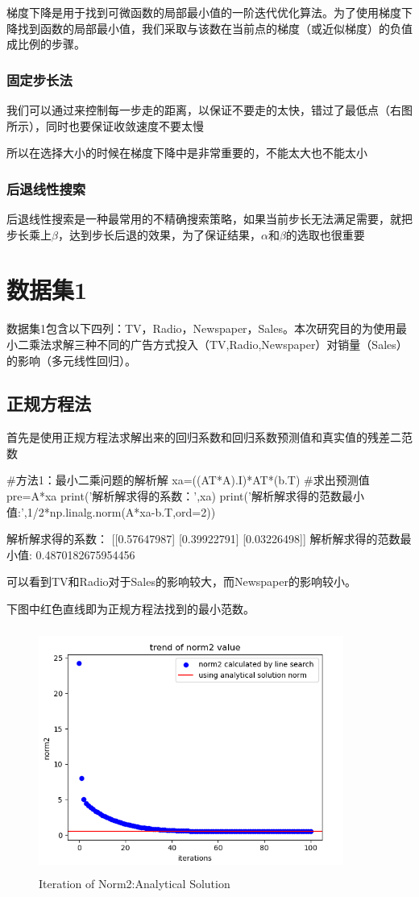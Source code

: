 \documentclass[12pt, a4paper, oneside, fontset=windows]{ctexart}
\begin{document}
梯度下降是用于找到可微函数的局部最小值的一阶迭代优化算法。为了使用梯度下降找到函数的局部最小值，我们采取与该数在当前点的梯度（或近似梯度）的负值成比例的步骤。
\subsubsection{固定步长法}
我们可以通过来控制每一步走的距离，以保证不要走的太快，错过了最低点（右图所示），同时也要保证收敛速度不要太慢

所以在选择大小的时候在梯度下降中是非常重要的，不能太大也不能太小

\subsubsection{后退线性搜索}
后退线性搜索是一种最常用的不精确搜索策略，如果当前步长无法满足需要，就把步长乘上$\beta$，达到步长后退的效果，为了保证结果，$\alpha$和$\beta$的选取也很重要
\section{数据集1}
数据集1包含以下四列：TV，Radio，Newspaper，Sales。本次研究目的为使用最小二乘法求解三种不同的广告方式投入（TV,Radio,Newspaper）对销量（Sales）的影响（多元线性回归）。
\subsection{正规方程法}
首先是使用正规方程法求解出来的回归系数和回归系数预测值和真实值的残差二范数
\begin{python}
    #方法1：最小二乘问题的解析解
    xa=((AT*A).I)*AT*(b.T)
    #求出预测值
    pre=A*xa
    print('解析解求得的系数：\n',xa)
    print('解析解求得的范数最小值:\n',1/2*np.linalg.norm(A*xa-b.T,ord=2))
\end{python}
\begin{python}
    解析解求得的系数：
    [[0.57647987]
    [0.39922791]
    [0.03226498]]
   解析解求得的范数最小值:
    0.4870182675954456
\end{python}

可以看到TV和Radio对于Sales的影响较大，而Newspaper的影响较小。

下图中红色直线即为正规方程法找到的最小范数。
\begin{figure}[H]
    \centering
    \includegraphics[width=10cm,height=8cm]{Analytical Solution Norm2.png}
    \caption{Iteration of Norm2:Analytical Solution}
\end{figure} 
\end{document}
